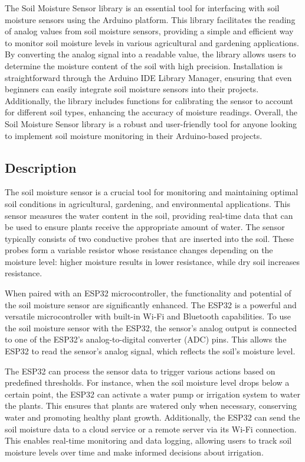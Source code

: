 The Soil Moisture Sensor library is an essential tool for interfacing with soil moisture sensors using the Arduino platform. This library facilitates the reading of analog values from soil moisture sensors, providing a simple and efficient way to monitor soil moisture levels in various agricultural and gardening applications. By converting the analog signal into a readable value, the library allows users to determine the moisture content of the soil with high precision. Installation is straightforward through the Arduino IDE Library Manager, ensuring that even beginners can easily integrate soil moisture sensors into their projects. Additionally, the library includes functions for calibrating the sensor to account for different soil types, enhancing the accuracy of moisture readings. Overall, the Soil Moisture Sensor library is a robust and user-friendly tool for anyone looking to implement soil moisture monitoring in their Arduino-based projects.


\subsection{Description}

The soil moisture sensor is a crucial tool for monitoring and maintaining optimal soil conditions in agricultural, gardening, and environmental applications. This sensor measures the water content in the soil, providing real-time data that can be used to ensure plants receive the appropriate amount of water. The sensor typically consists of two conductive probes that are inserted into the soil. These probes form a variable resistor whose resistance changes depending on the moisture level: higher moisture results in lower resistance, while dry soil increases resistance.

When paired with an ESP32 microcontroller, the functionality and potential of the soil moisture sensor are significantly enhanced. The ESP32 is a powerful and versatile microcontroller with built-in Wi-Fi and Bluetooth capabilities. To use the soil moisture sensor with the ESP32, the sensor's analog output is connected to one of the ESP32's analog-to-digital converter (ADC) pins. This allows the ESP32 to read the sensor's analog signal, which reflects the soil's moisture level.

The ESP32 can process the sensor data to trigger various actions based on predefined thresholds. For instance, when the soil moisture level drops below a certain point, the ESP32 can activate a water pump or irrigation system to water the plants. This ensures that plants are watered only when necessary, conserving water and promoting healthy plant growth. Additionally, the ESP32 can send the soil moisture data to a cloud service or a remote server via its Wi-Fi connection. This enables real-time monitoring and data logging, allowing users to track soil moisture levels over time and make informed decisions about irrigation.


